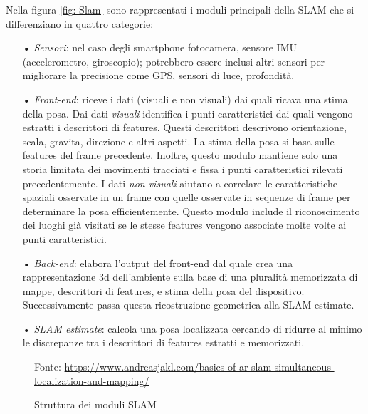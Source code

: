 \documentclass[crop=false, class=book]{standalone}
\begin{document}
		\begin{flushleft}
			Nella figura \vref{fig: Slam} sono rappresentati i moduli principali della SLAM che si differenziano in quattro 			categorie:
		\end{flushleft}
		
		\begin{itemize}
			\item[•] \emph{Sensori}: nel caso degli smartphone fotocamera, sensore IMU (accelerometro, giroscopio); potrebbero essere inclusi altri sensori per migliorare la precisione come GPS, sensori di luce, profondità.
			\item[•] \emph{Front-end}: riceve i dati (visuali e non visuali) dai quali ricava una stima della posa. Dai dati \textit{visuali} identifica i punti caratteristici dai quali vengono estratti i descrittori di features. Questi descrittori descrivono orientazione, scala, gravita, direzione e altri aspetti. La stima della posa si basa sulle features del frame precedente. Inoltre, questo modulo mantiene solo una storia limitata dei movimenti tracciati e fissa i punti caratteristici rilevati precedentemente. I dati \textit{non visuali} aiutano a correlare le caratteristiche spaziali osservate in un frame con quelle osservate in sequenze di frame per determinare la posa efficientemente. Questo modulo include il riconoscimento dei luoghi già visitati se le stesse features vengono associate molte volte ai punti caratteristici.
			\item[•] \emph{Back-end}: elabora l'output del front-end dal quale crea una rappresentazione 3d dell'ambiente sulla base di una pluralità memorizzata di mappe, descrittori di features, e stima della posa del dispositivo. Successivamente passa questa ricostruzione geometrica alla SLAM estimate.
			\item[•] \emph{SLAM estimate}: calcola una posa localizzata cercando di ridurre al minimo le discrepanze tra i descrittori di features estratti e memorizzati.
		\end{itemize}
	
		\begin{figure}
			\centering
			{Fonte: \url{https://www.andreasjakl.com/basics-of-ar-slam-simultaneous-localization-and-mapping/}}
			\caption{Struttura dei moduli SLAM}
			\label{fig: Slam}
		\end{figure}
		
\end{document}

